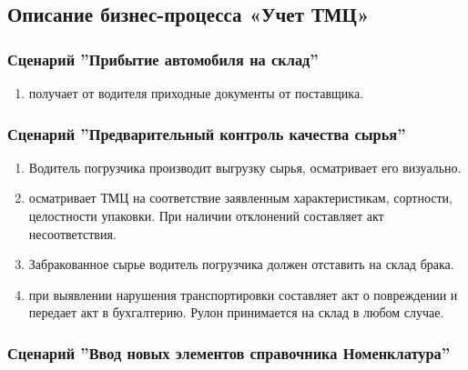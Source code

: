 \newpage
\subsection{Описание бизнес-процесса «Учет ТМЦ»}
\label{bp:storage}

\subsubsection{Сценарий ''Прибытие автомобиля на склад''}
\label{bp:storage_1}


\begin{enumerate}

\item	\kladovshik получает от водителя приходные документы от поставщика.

\end{enumerate}




\subsubsection{Сценарий ''Предварительный контроль качества сырья''}
\label{bp:storage_2}


\begin{enumerate}

\item  Водитель погрузчика производит выгрузку сырья, \kladovshik осматривает его визуально. 

\item	\kladovshik 
осматривает ТМЦ на соответствие заявленным характеристикам, сортности, целостности упаковки. При наличии отклонений составляет акт несоответствия.

\item Забракованное сырье водитель погрузчика должен отставить на склад брака.

\item \kladovshik при выявлении нарушения транспортировки составляет акт о повреждении и передает акт в бухгалтерию. Рулон принимается на склад в любом случае.
\end{enumerate}


\subsubsection{Сценарий ''Ввод новых элементов справочника Номенклатура''}
\label{bp:storage_4}



